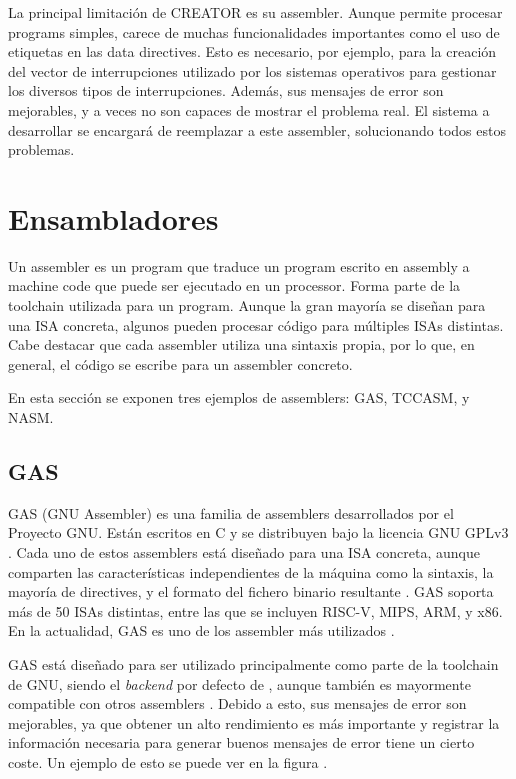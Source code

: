 La principal limitación de CREATOR es su \gls{assembler}. Aunque permite
procesar \glspl{program} simples, carece de muchas funcionalidades importantes
como el uso de etiquetas en las \glspl{data directive}. Esto es necesario, por
ejemplo, para la creación del vector de interrupciones utilizado por los
sistemas operativos para gestionar los diversos tipos de interrupciones. Además,
sus mensajes de error son mejorables, y a veces no son capaces de mostrar el
problema real. El sistema a desarrollar se encargará de reemplazar a este
\gls{assembler}, solucionando todos estos problemas.


\section{Ensambladores}\label{sec:assemblers}

Un \gls{assembler} es un \gls{program} que traduce un \gls{program} escrito en
\gls{assembly} a \gls{machine code} que puede ser ejecutado en un
\gls{processor}. Forma parte de la \gls{toolchain} utilizada para
 un \gls{program}. Aunque la gran mayoría se
diseñan para una \gls{ISA} concreta, algunos pueden procesar código para
múltiples \glspl{ISA} distintas. Cabe destacar que cada \gls{assembler} utiliza
una sintaxis propia, por lo que, en general, el código se escribe para un
\gls{assembler} concreto.

En esta sección se exponen tres ejemplos de \glspl{assembler}: GAS, TCCASM, y NASM.

\subsection{GAS}

GAS (GNU Assembler) \parencite{GNUas} es una familia de \glspl{assembler}
desarrollados por el Proyecto GNU. Están escritos en C y se distribuyen bajo la
licencia GNU GPLv3 \parencite{gpl}. Cada uno de estos \glspl{assembler} está
diseñado para una \gls{ISA} concreta, aunque comparten las características
independientes de la máquina como la sintaxis, la mayoría de \glspl{directive},
y el formato del fichero binario resultante \parencite{as-manual}. GAS soporta
más de 50 \glspl{ISA} distintas, entre las que se incluyen RISC-V, MIPS, ARM, y
x86. En la actualidad, GAS es uno de los \gls{assembler} más utilizados
\parencite{assembler-usage}.

GAS está diseñado para ser utilizado principalmente como parte de la
\gls{toolchain} de GNU, siendo el \textit{backend} por defecto de ,
aunque también es mayormente compatible con otros \glspl{assembler}
\parencite{as-manual}. Debido a esto, sus mensajes de error son mejorables, ya
que obtener un alto rendimiento es más importante y registrar la información
necesaria para generar buenos mensajes de error tiene un cierto coste. Un
ejemplo de esto se puede ver en la figura .

